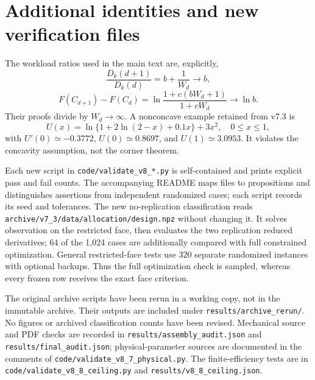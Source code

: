 \documentclass[11pt,a4paper]{article}
\theoremstyle{definition}\newtheorem{definition}{Definition}
\begin{document}
\section{Additional identities and new verification files}
\label{supp:newchecks}
The workload ratios used in the main text are, explicitly,
\begin{equation}
 \frac{D_k(d+1)}{D_k(d)}=b+\frac1{W_d}\longrightarrow b,
 \label{eq:recursion-cost}
\end{equation}
\begin{equation}
 F(C_{d+1})-F(C_d)=\ln\frac{1+c(bW_d+1)}{1+cW_d}\longrightarrow\ln b.
 \label{eq:recursion-value}
\end{equation}
Their proofs divide by $W_d\to\infty$. A nonconcave example retained from
v7.3 is
\begin{equation}
 U(x)=\ln\{1+2\ln(2-x)+0.1x\}+3x^2,\quad 0\leq x\leq1,
 \label{eq:nonconcave}
\end{equation}
with $U'(0)\simeq-0.3772$, $U(0)\simeq0.8697$, and
$U(1)\simeq3.0953$. It violates the concavity assumption, not the corner theorem.

Each new script in \texttt{code/validate\_v8\_*.py} is self-contained and
prints explicit pass and fail counts. The accompanying README maps files
to propositions and distinguishes assertions from independent randomized
cases; each script records its seed and tolerances. The new no-replication classification reads
\texttt{archive/v7\_3/data/allocation/design.npz} without changing it.
It solves observation on the restricted face, then evaluates the two
replication reduced derivatives; 64 of the 1,024 cases are additionally
compared with full constrained optimization. General restricted-face tests
use 320 separate randomized instances with optional backups. Thus the full
optimization check is sampled, whereas every frozen row receives the exact
face criterion.

The original archive scripts have been rerun in a working copy, not in the
immutable archive. Their outputs are included under
\texttt{results/archive\_rerun/}. No figures or archived classification
counts have been revised. Mechanical source and PDF checks are recorded in
\texttt{results/assembly\_audit.json} and
\texttt{results/final\_audit.json}; physical-parameter sources are documented
in the comments of \texttt{code/validate\_v8\_7\_physical.py}.
The finite-efficiency tests are in \texttt{code/validate\_v8\_8\_ceiling.py}
and \texttt{results/v8\_8\_ceiling.json}.
\end{document}
